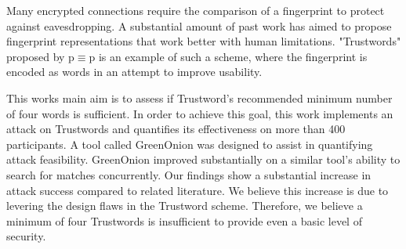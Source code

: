 Many encrypted connections require the comparison of a fingerprint to protect against eavesdropping. A substantial amount of past work has aimed to propose fingerprint representations that work better with human limitations. "Trustwords" proposed by p$\equiv$p is an example of such a scheme, where the fingerprint is encoded as words in an attempt to improve usability.

This works main aim is to assess if Trustword's recommended minimum number of four words is sufficient.
In order to achieve this goal, this work implements an attack on Trustwords and quantifies its effectiveness on more than 400 participants.  A tool called GreenOnion was designed to assist in quantifying attack feasibility. GreenOnion improved substantially on a similar tool's ability to search for matches concurrently. Our findings show a substantial increase in attack success compared to related literature. We believe this increase is due to levering the design flaws in the Trustword scheme. Therefore, we believe a minimum of four Trustwords is insufficient to provide even a basic level of security.